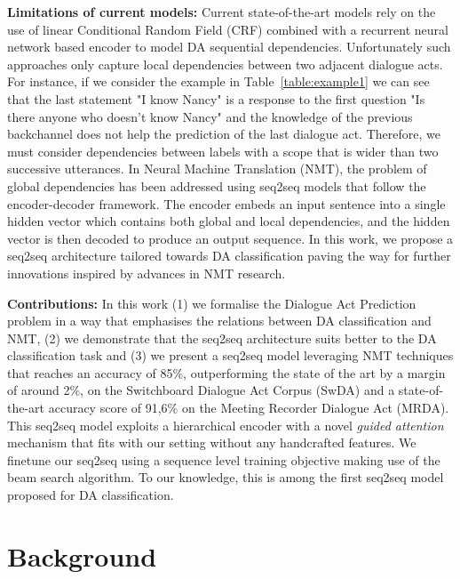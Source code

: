 \documentclass[letterpaper]{article} \usepackage{aaai20}  \usepackage{times}  \usepackage{helvet} \usepackage{courier}  \usepackage[hyphens]{url}  \usepackage{graphicx} \urlstyle{rm} \def\UrlFont{\rm}  \usepackage{graphicx}  \frenchspacing  \setlength{\pdfpagewidth}{8.5in}  \setlength{\pdfpageheight}{11in}
\begin{document}
\textbf{Limitations of current models:} Current state-of-the-art models rely on the use of linear Conditional Random Field (CRF) combined with a recurrent neural network based encoder \cite{crf_multi_task,LSTM_CRF,DAClassifCxt} to model DA sequential dependencies. Unfortunately such approaches only capture local dependencies between two adjacent dialogue acts. For instance, if we consider the example in Table~\ref{table:example1} we can see that the last statement "I know Nancy" is a response to the first question "Is there anyone who doesn't know Nancy" and the knowledge of the previous backchannel does not help the prediction of the last dialogue act. Therefore, we must consider dependencies between labels with a scope that is wider than two successive utterances. In Neural Machine Translation (NMT), the problem of global dependencies has been addressed using seq2seq models \cite{seq2seq} that follow the encoder-decoder framework. The encoder embeds an input sentence into a single hidden vector which contains both global and local dependencies, and the hidden vector is then decoded to produce an output sequence. In this work, we propose a seq2seq architecture tailored towards DA classification paving the way for further innovations inspired by advances in NMT research.

\textbf{Contributions:} In this work (1) we formalise the Dialogue Act Prediction problem in a way that emphasises the relations between DA classification and NMT, (2) we demonstrate that the seq2seq architecture suits better to the DA classification task and (3) we present a seq2seq model leveraging NMT techniques that reaches an accuracy of 85\%, outperforming the state of the art by a margin of around 2\%, on the Switchboard Dialogue Act Corpus (SwDA) \cite{switchboard_da} and a state-of-the-art accuracy score of 91,6\% on the Meeting Recorder Dialogue Act (MRDA).
This seq2seq model exploits a hierarchical encoder with a novel \textit{guided attention} mechanism that fits with our setting without any handcrafted features. We finetune our seq2seq using a sequence level training objective making use of the beam search algorithm. To our knowledge, this is among the first seq2seq model proposed for DA classification.

\section{Background}
\end{document}

